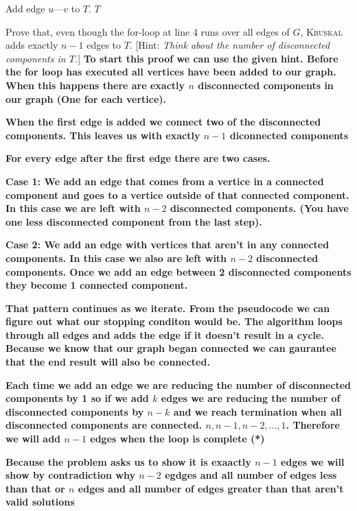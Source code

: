 \documentclass[addpoints]{exam}
\begin{document}
\begin{questions}
\begin{algorithmic}[1]
            \State Add edge $u$---$v$ to $T$.
        \EndIf
    \EndFor
    \State \Return $T$
    \EndFunction
\end{algorithmic}

Prove that, even though the for-loop at line 4 runs over all edges of $G$, \textsc{Kruskal} adds exactly $n-1$ edges to $T$. [Hint: \textit{Think about the number of disconnected components in $T$.}]
\textbf{To start this proof we can use the given hint. Before the for loop has executed all vertices have been added to our graph. When this happens there are exactly $n$ disconnected components in our graph (One for each vertice).}

\textbf{When the first edge is added we connect two of the disconnected components. This leaves us with exactly $n-1$ diconnected components}

\textbf{For every edge after the first edge there are two cases.}

\textbf{Case 1: We add an edge that comes from a vertice in a connected component and goes to a vertice outside of that connected component. In this case we are left with $n-2$ disconnected components. (You have one less disconnected component from the last step).}

\textbf{Case 2: We add an edge with vertices that aren't in any connected components. In this case we also are left with $n-2$ disconnected components. Once we add an edge between 2 disconnected components they become 1 connected component.}

\textbf{That pattern continues as we iterate. From the pseudocode we can figure out what our stopping conditon would be. The algorithm loops through all edges and adds the edge if it doesn't result in a cycle. Because we know that our graph began connected we can gaurantee that the end result will also be connected.}

\textbf{Each time we add an edge we are reducing the number of disconnected components by 1 so if we add $k$ edges we are reducing the number of disconnected components by $n-k$ and we reach termination when all disconnected components are connected. $n,n-1,n-2,...,1$. Therefore we will add $n-1$ edges when the loop is complete (*)}

\textbf{Because the problem asks us to show it is exaactly $n-1$ edges we will show by contradiction why $n-2$ egdges and all number of edges less than that or $n$ edges and all number of edges greater than that aren't valid solutions}


\end{questions}
\end{document}
